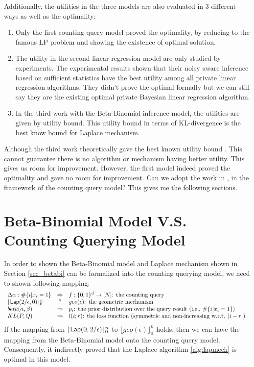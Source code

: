 \documentclass{article}
\begin{document}
Additionally, the utilities in the three models are also evaluated in 3 different ways as well as the optimality:
\begin{enumerate} 
\item Only the first counting query model proved the optimality,
by reducing to the famous LP problem and showing the existence of optimal solution.
%
\item The utility in the second linear regression model are only studied by experiments. 
The experimental results shown that their noisy aware inference based on sufficient statistics
have the best utility among all private linear regression algorithms.
They didn't prove the optimal formally but we can still say they are the existing optimal private Bayesian linear regression algorithm.
%
\item In the third work with the Beta-Binomial inference model, the utilities are given by utility bound. This utility bound in terms of KL-divergence is the best know bound for Laplace mechanism.
\end{enumerate}
%

Although the third work theoretically gave the best known utility bound \cite{zhang2016differential}.
This cannot guarantee there is no algorithm or mechanism having better utility.
This gives us room for improvement. 
%
However, the first model indeed proved the optimality and gave no room for improvement.
%
Can we adopt the work in \cite{bernstein2019differentially}, \cite{zhang2016differential}
in the framework of the counting query model?
This gives me the following sections.

%

\section{Beta-Binomial Model V.S. Counting Querying Model}
In order to shown the Beta-Binomial model and Laplace mechanism shown in Section \ref{sec_betabi} can be 
formalized into the counting querying model, we need to shown following mapping:
\[
	\begin{array}{lcl}
	\Delta \alpha : \#\{i |x_i = 1\}
	& \Rightarrow &
	f:\{0, 1\}^d \rightarrow [N] \mbox{: the counting query}\\
	\lfloor \mathsf{Lap}(2/\epsilon, 0) \rfloor_0^{n}
	& ? &
	geo(\epsilon) \mbox{: the geometric mechanism}\\
	beta(\alpha, \beta)
	& \Rightarrow &
	p_{i} \mbox{: the prior distribution over the query result (i.e., $\#\{i |x_i = 1\}$) }\\
	KL(P, Q)
	& \Rightarrow &
	l(i; r) \mbox{: the loss function (symmetric and non-increasing w.r.t. $|i - r|$).}
	\end{array}
\]
If the mapping from $\lfloor \mathsf{Lap}(0, 2/\epsilon) \rfloor_0^{n}$ to $\lfloor geo(\epsilon) \rfloor_0^{n}$ holds,
then we can have the mapping from the Beta-Binomial model onto the counting query model.
Consequently, 
it indirectly proved that the Laplace algorithm \ref{alg:lapmech} is optimal in this model.
\end{document}
